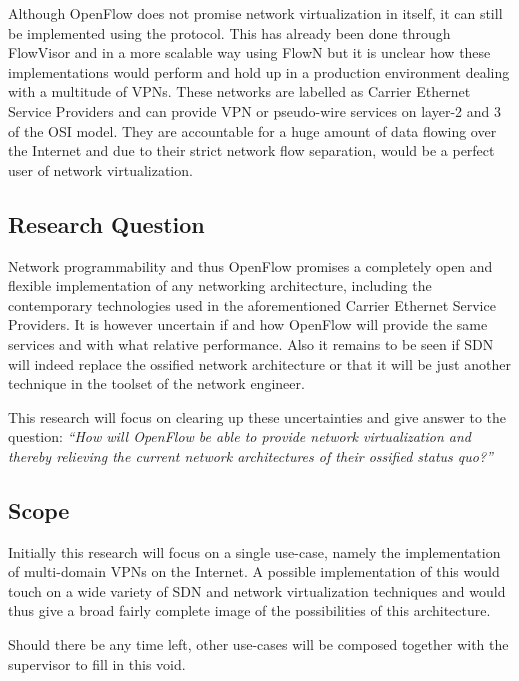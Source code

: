 \documentclass[oneside,twocolumn,7pt,a4paper]{article}
\begin{document}
	Although OpenFlow does not promise network virtualization in itself, it can still be implemented using the protocol. This has already been done through FlowVisor \cite{flowvisor} and in a more scalable way using FlowN \cite{drutskoy2012scalable} but it is unclear how these implementations would perform and hold up in a production environment dealing with a multitude of VPNs. These networks are labelled as Carrier Ethernet Service Providers and can provide VPN or pseudo-wire services on layer-2 and 3 of the OSI model. They are accountable for a huge amount of data flowing over the Internet and due to their strict network flow separation, would be a perfect user of network virtualization.
			
		\subsection*{Research Question} %
		\label{sub:research_question}
		Network programmability and thus OpenFlow promises a completely open and flexible implementation of any networking architecture, including the contemporary technologies used in the aforementioned Carrier Ethernet Service Providers. It is however uncertain if and how OpenFlow will provide the same services and with what relative performance. Also it remains to be seen if SDN will indeed replace the ossified network architecture or that it will be just another technique in the toolset of the network engineer.
		
		 This research will focus on clearing up these uncertainties and give answer to the question: \textsl{``How will OpenFlow be able to provide network virtualization and thereby relieving the current network architectures of their ossified status quo?''}		

		
		\subsection*{Scope} %
		\label{sub:scope}
		Initially this research will focus on a single use-case, namely the implementation of multi-domain VPNs on the Internet. A possible implementation of this would touch on a wide variety of SDN and network virtualization techniques and would thus give a broad fairly complete image of the possibilities of this architecture.
		
		Should there be any time left, other use-cases will be composed together with the supervisor to fill in this void.
		
\end{document}

